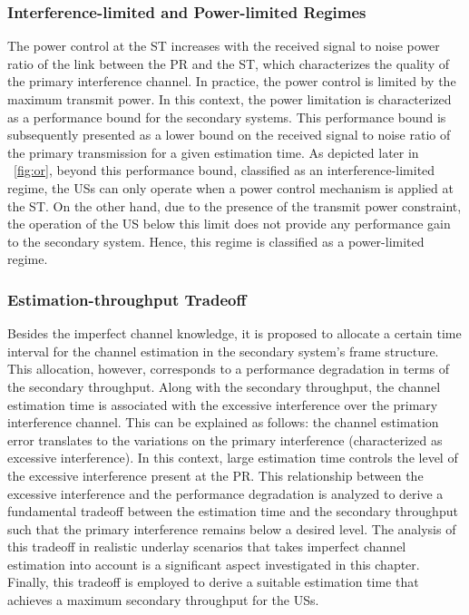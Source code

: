 \subsubsection{Interference-limited and Power-limited Regimes}
The power control at the ST increases with the received signal to noise power ratio of the link between the PR and the ST, which characterizes the quality of the primary interference channel. In practice, the power control is limited by the maximum transmit power. In this context, the power limitation is characterized as a performance bound for the secondary systems. This performance bound is subsequently presented as a lower bound on the received signal to noise ratio of the primary transmission for a given estimation time. As depicted later in \figurename~\ref{fig:or}, beyond this performance bound, classified as an interference-limited regime, the USs can only operate when a power control mechanism is applied at the ST. On the other hand, due to the presence of the transmit power constraint, the operation of the US below this limit does not provide any performance gain to the secondary system. Hence, this regime is classified as a power-limited regime. 
\subsubsection{Estimation-throughput Tradeoff}
Besides the imperfect channel knowledge, it is proposed to allocate a certain time interval for the channel estimation in the secondary system's frame structure. This allocation, however, corresponds to a performance degradation in terms of the secondary throughput. Along with the secondary throughput, the channel estimation time is associated with the excessive interference over the primary interference channel. This can be explained as follows: the channel estimation error translates to the variations on the primary interference (characterized as excessive interference). In this context, large estimation time controls the level of the excessive interference present at the PR. This relationship between the excessive interference and the performance degradation is analyzed to derive a fundamental tradeoff between the estimation time and the secondary throughput such that the primary interference remains below a desired level. The analysis of this tradeoff in realistic underlay scenarios that takes imperfect channel estimation into account is a significant aspect investigated in this chapter. Finally, this tradeoff is employed to derive a suitable estimation time that achieves a maximum secondary throughput for the USs. %
